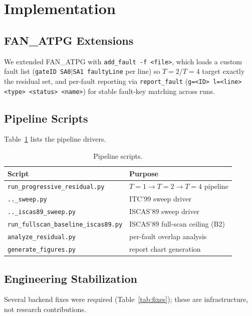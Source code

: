 \documentclass[conference]{IEEEtran}
\begin{document}
\section{Implementation}
\label{sec:impl}

\subsection{FAN\_ATPG Extensions}
We extended FAN\_ATPG with \texttt{add\_fault -f <file>}, which loads a custom
fault list (\texttt{gateID SA0$|$SA1 faultyLine} per line) so $T{=}2$/$T{=}4$
target exactly the residual set, and per-fault reporting via
\texttt{report\_fault} (\texttt{g=<ID> l=<line> <type> <status> <name>}) for
stable fault-key matching across runs.

\subsection{Pipeline Scripts}
Table~\ref{tab:scripts} lists the pipeline drivers.

\begin{table}[t]
\caption{Pipeline scripts.}
\label{tab:scripts}
\centering
\footnotesize
\begin{tabular}{@{}p{4.0cm}p{4.0cm}@{}}
\toprule
Script & Purpose \\
\midrule
\texttt{run\_progressive\_residual.py} & $T{=}1{\to}T{=}2{\to}T{=}4$ pipeline \\
\texttt{..\_sweep.py} & ITC'99 sweep driver \\
\texttt{..\_iscas89\_sweep.py} & ISCAS'89 sweep driver \\
\texttt{run\_fullscan\_baseline\_iscas89.py} & ISCAS'89 full-scan ceiling (B2) \\
\texttt{analyze\_residual.py} & per-fault overlap analysis \\
\texttt{generate\_figures.py} & report chart generation \\
\bottomrule
\end{tabular}
\end{table}

\subsection{Engineering Stabilization}
Several backend fixes were required (Table~\ref{tab:fixes}); these are
infrastructure, not research contributions.
\end{document}
